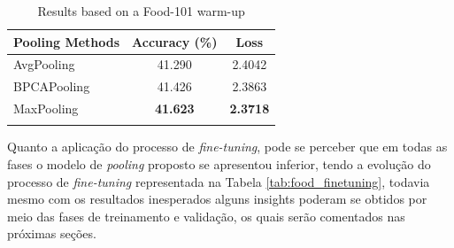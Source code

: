 \begin{table}[htbp]
    \caption{Results based on a Food-101 warm-up}
    \label{tab:food_values}
    \centering
    \begin{tabular}{lcc}
        \firsthline
        \textbf{Pooling Methods} & \textbf{Accuracy (\%)} & \textbf{Loss}   \\
        \hline
        AvgPooling               & 41.290                 & 2.4042          \\
        BPCAPooling              & 41.426                 & 2.3863          \\
        MaxPooling               & \textbf{41.623}        & \textbf{2.3718} \\
        \lasthline
    \end{tabular}
\end{table}

Quanto a aplicação do processo de \textit{fine-tuning}, pode se perceber que em todas as fases o modelo de \textit{pooling} proposto se apresentou inferior, tendo a evolução do processo de \textit{fine-tuning} representada na Tabela \ref{tab:food_finetuning}, todavia mesmo com os resultados inesperados alguns insights poderam se obtidos por meio das fases de treinamento e validação, os quais serão comentados nas próximas seções.

